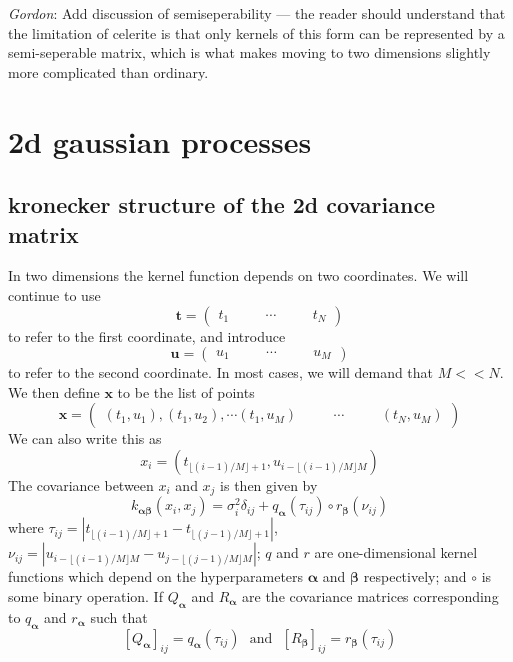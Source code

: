 \documentclass[modern]{aastex62}
\newcommand{\todo}[3]{{\color{#2}\emph{#1}: #3}}
\newcommand{\gordontodo}[1]{\todo{Gordon}{red}{#1}}
\newcommand{\project}[1]{\textsf{#1}}
\newcommand{\celerite}{\project{celerite }}
\newcommand{\bvec}[1]{{\ensuremath{\boldsymbol{#1}}}}
\newcommand{\expandvec}[2]{\left(\begin{array}{ccccc} #1\quad && \cdots\quad && #2 \end{array}\right)}
\begin{document}
		\gordontodo{Add discussion of semiseperability --- the reader should understand that the limitation of \celerite is that only kernels of this form can be 
		represented by a semi-seperable matrix, which is what makes moving to two dimensions slightly more complicated than ordinary.}
		

\section{2d gaussian processes}
	\subsection{kronecker structure of the 2d covariance matrix}
	In two dimensions the kernel function depends on two coordinates. We will continue to use
	\begin{equation}
		\bvec{t} = \expandvec{t_1}{t_N}
	\end{equation}
	to refer to the first coordinate, and introduce
	\begin{equation}
		\bvec{u} = \expandvec{u_1}{u_M}
	\end{equation}
	to refer to the second coordinate. In most cases, we will demand that $M << N$. We then define $\bvec{x}$ to be the list of points
	\begin{equation}
		\bvec{x} = \expandvec{(t_1, u_1), (t_1, u_2), \cdots (t_1, u_M)}{(t_N, u_M)}
	\end{equation}
	We can also write this as
	\begin{equation}
		x_i = (t_{\lfloor(i-1)/M\rfloor + 1}, u_{i - \lfloor(i-1)/M\rfloor M})
	\end{equation} 
	The covariance between $x_i$ and $x_j$ is then given by
	\begin{equation}
		k_{\bvec{\alpha}\bvec{\beta}}(x_i, x_j) = \sigma_i^2\delta_{ij} + q_\bvec{\alpha}(\tau_{ij})\circ r_\bvec{\beta}(\nu_{ij})
	\end{equation}
	where $\tau_{ij} = |t_{\lfloor(i-1)/M\rfloor + 1}-t_{\lfloor(j-1)/M\rfloor + 1}|$, 
	$\nu_{ij} = |u_{i - \lfloor(i-1)/M\rfloor M}-u_{j - \lfloor(j-1)/M\rfloor M}|$; 
	$q$ and $r$ are one-dimensional kernel functions which depend on the hyperparameters $\bvec{\alpha}$ and 
	$\bvec{\beta}$ respectively; 
	and $\circ$ is some binary operation. 
	If $Q_\bvec{\alpha}$ and $R_\bvec{\alpha}$ are the covariance matrices corresponding to 
	$q_\bvec{\alpha}$ and $r_\bvec{\alpha}$ such that
	\begin{equation}
		\left[Q_\bvec{\alpha}\right]_{ij} = q_\bvec{\alpha}(\tau_{ij})\ \ \ \mathrm{and}\ \ \ \left[R_\bvec{\beta}\right]_{ij} = r_\bvec{\beta}(\tau_{ij})
	\end{equation} 
\end{document}
